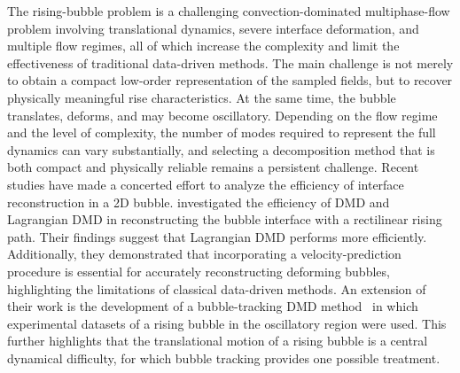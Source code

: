 \documentclass[a4paper,fleqn]{cas-sc}
\begin{document}
	The rising-bubble problem is a challenging convection-dominated multiphase-flow problem involving translational dynamics, severe interface deformation, and multiple flow regimes, all of which increase the complexity and limit the effectiveness of traditional data-driven methods. The main challenge is not merely to obtain a compact low-order representation of the sampled fields, but to recover physically meaningful rise characteristics. At the same time, the bubble translates, deforms, and may become oscillatory. Depending on the flow regime and the level of complexity, the number of modes required to represent the full dynamics can vary substantially, and selecting a decomposition method that is both compact and physically reliable remains a persistent challenge. Recent studies have made a concerted effort to analyze the efficiency of interface reconstruction in a 2D bubble. \citet{Yin2023a} investigated the efficiency of DMD and Lagrangian DMD in reconstructing the bubble interface with a rectilinear rising path. Their findings suggest that Lagrangian DMD performs more efficiently.
    Additionally, they demonstrated that incorporating a velocity-prediction procedure is essential for accurately reconstructing deforming bubbles, highlighting the limitations of classical data-driven methods. An extension of their work is the development of a bubble-tracking DMD method~\cite{Yin2023} in which experimental datasets of a rising bubble in the oscillatory region were used. This further highlights that the translational motion of a rising bubble is a central dynamical difficulty, for which bubble tracking provides one possible treatment.
	
\end{document}
